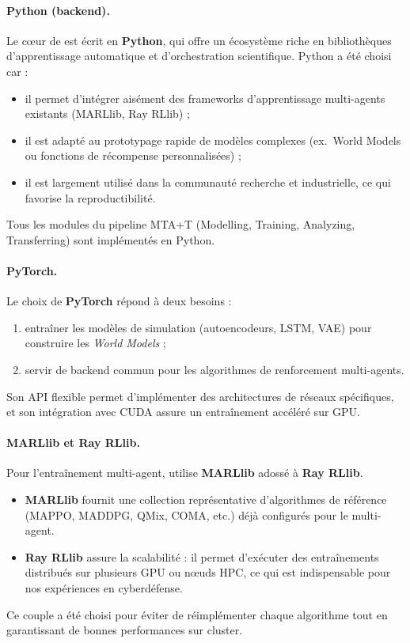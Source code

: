 \paragraph{Python (backend).}
Le cœur de  est écrit en \textbf{Python}, qui offre un écosystème riche en bibliothèques d’apprentissage automatique et d’orchestration scientifique. Python a été choisi car :
\begin{itemize}
  \item il permet d’intégrer aisément des frameworks d’apprentissage multi-agents existants (MARLlib, Ray RLlib) ;
  \item il est adapté au prototypage rapide de modèles complexes (ex.~World Models ou fonctions de récompense personnalisées) ;
  \item il est largement utilisé dans la communauté recherche et industrielle, ce qui favorise la reproductibilité.
\end{itemize}
Tous les modules du pipeline MTA+T (Modelling, Training, Analyzing, Transferring) sont implémentés en Python.

\paragraph{PyTorch.}
Le choix de \textbf{PyTorch} répond à deux besoins :
\begin{enumerate}
  \item entraîner les modèles de simulation (autoencodeurs, LSTM, VAE) pour construire les \textit{World Models} ;
  \item servir de backend commun pour les algorithmes de renforcement multi-agents.
\end{enumerate}
Son API flexible permet d’implémenter des architectures de réseaux spécifiques, et son intégration avec CUDA assure un entraînement accéléré sur GPU.

\paragraph{MARLlib et Ray RLlib.}
Pour l’entraînement multi-agent,  utilise \textbf{MARLlib} adossé à \textbf{Ray RLlib}.
\begin{itemize}
  \item \textbf{MARLlib} fournit une collection représentative d’algorithmes de référence (MAPPO, MADDPG, QMix, COMA, etc.) déjà configurés pour le multi-agent.
  \item \textbf{Ray RLlib} assure la scalabilité : il permet d’exécuter des entraînements distribués sur plusieurs GPU ou nœuds HPC, ce qui est indispensable pour nos expériences en cyberdéfense.
\end{itemize}
Ce couple a été choisi pour éviter de réimplémenter chaque algorithme tout en garantissant de bonnes performances sur cluster.

